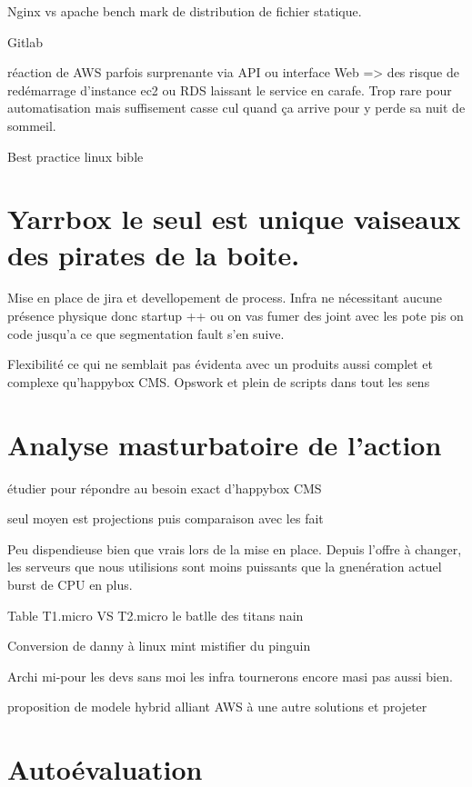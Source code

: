\documentclass[11pt, a4paper ]{article}
\let\stdsection\section
\renewcommand\section{\newpage\stdsection}
\begin{document}
\begin{spacing}{1.5}
Nginx vs apache bench mark de distribution de fichier statique.

Gitlab

réaction de AWS parfois surprenante via API ou interface Web => des risque de redémarrage d'instance ec2 ou RDS laissant le service en carafe. Trop rare pour automatisation mais suffisement casse cul quand ça arrive pour y perde sa nuit de sommeil.

Best practice linux bible



	\section{Yarrbox le seul est unique vaiseaux des pirates de la boite.} %

Mise en place de jira et devellopement de process. 
Infra ne nécessitant aucune présence physique donc startup ++ ou on vas fumer des joint avec les pote pis on code jusqu'a ce que segmentation fault s'en suive.

Flexibilité ce qui ne semblait pas évidenta avec un produits aussi complet et complexe qu'happybox CMS. Opswork et plein de scripts dans tout les sens


	\section{Analyse masturbatoire de l'action} %
étudier pour répondre au besoin exact d'happybox CMS

seul moyen est projections puis comparaison avec les fait

Peu dispendieuse bien que vrais lors de la mise en place. Depuis l'offre à changer, les serveurs que nous utilisions sont moins puissants que la gnenération actuel burst de CPU en plus.

			Table T1.micro VS T2.micro le batlle des titans nain

Conversion de danny à linux mint mistifier du pinguin

Archi mi-pour les devs sans moi les infra tournerons encore masi pas aussi bien.

proposition de modele hybrid alliant AWS à une autre solutions et projeter




	\section{Autoévaluation} %


\end{spacing}
\end{document}
